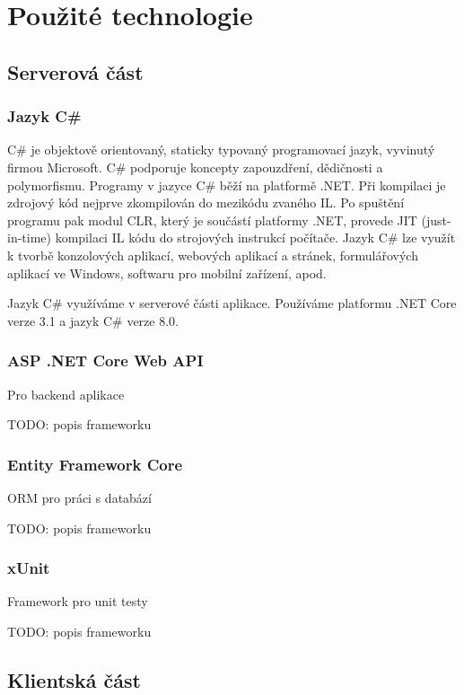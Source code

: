 
\chapter{Použité technologie}

\section{Serverová část}

\subsection{Jazyk C\#}
C\# je objektově orientovaný, staticky typovaný programovací jazyk, vyvinutý firmou Microsoft.
C\# podporuje koncepty zapouzdření, dědičnosti a polymorfismu. Programy v jazyce C\# běží na platformě .NET. 
Při kompilaci je zdrojový kód nejprve zkompilován do mezikódu zvaného IL. 
Po spuštění programu pak modul CLR, který je součástí platformy .NET, provede JIT (just-in-time) kompilaci IL kódu do strojových instrukcí počítače.
Jazyk C\# lze využít k tvorbě konzolových aplikací, webových aplikací a stránek, formulářových aplikací ve Windows, softwaru pro mobilní zařízení, apod. \cite{CSharpDocs}

Jazyk C\# využíváme v serverové části aplikace. Používáme platformu .NET Core verze 3.1 a jazyk C\# verze 8.0.

\subsection{ASP .NET Core Web API}
Pro backend aplikace \cite{AspNetDocs}

TODO: popis frameworku

\subsection{Entity Framework Core}
ORM pro práci s databází

TODO: popis frameworku

\subsection{xUnit}
Framework pro unit testy

TODO: popis frameworku

\section{Klientská část}

